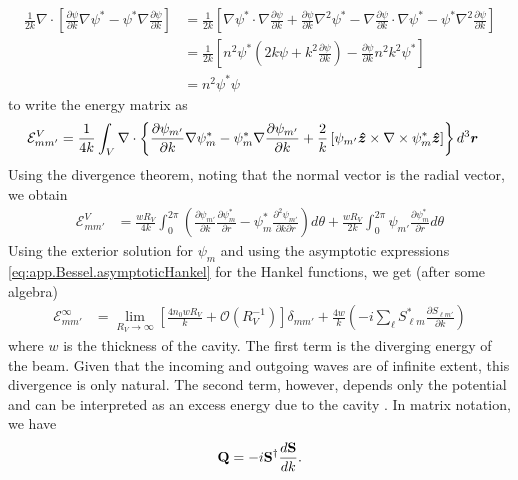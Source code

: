   \begin{align*}
   \frac{1}{2k}\nabla\cdot\left[\frac{\partial\psi}{\partial k}\nabla\psi^*-\psi^*\nabla\frac{\partial\psi}{\partial k}\right]
	&= \frac{1}{2k}\left[\nabla\psi^*\cdot\nabla\frac{\partial\psi}{\partial k}+\frac{\partial\psi}{\partial k}\nabla^2\psi^*
			  -\nabla\frac{\partial\psi}{\partial k}\cdot\nabla\psi^*-\psi^*\nabla^2\frac{\partial\psi}{\partial k}\right]	\\
	&= \frac{1}{2k}\left[n^2\psi^*\left(2k\psi+k^2\frac{\partial\psi}{\partial k}\right)-\frac{\partial\psi}{\partial k}n^2k^2\psi^*\right]\\
	&= n^2\psi^*\psi
  \end{align*}
to write the energy matrix as
  \begin{align*}
    \mathcal{E}^V_{mm'} &= \frac{1}{4k}\int_V\nabla\cdot
			    \left\{
			      \frac{\partial\psi_{m'}}{\partial k}\nabla\psi^*_{m}-\psi^*_m\nabla\frac{\partial\psi_{m'}}{\partial k}
			+   \frac{2}{k}\left[\psi_{m'}\boldsymbol{\hat{z}}\times\nabla\times\psi^*_m\boldsymbol{\hat{z}}\right]\right\}d^3\boldsymbol{r}
  \end{align*}
Using the divergence theorem, noting that the normal vector
is the radial vector, we obtain
  \begin{align*}
    \mathcal{E}^V_{mm'}	&= \frac{wR_V}{4k}
			  \int_0^{2\pi}\left(\frac{\partial\psi_{m'}}{\partial k}\frac{\partial\psi^*_m}{\partial r}
					      -\psi^*_m\frac{\partial^2\psi_{m'}}{\partial k\partial r}\right)d\theta	\nonumber
			+\frac{wR_V}{2k}
			  \int_0^{2\pi}\psi_{m'}\frac{\partial\psi^*_m}{\partial r} d\theta
  \end{align*}
Using the exterior solution for $\psi_m$ and using the 
asymptotic expressions \eqref{eq:app.Bessel.asymptoticHankel} for the Hankel functions, we get
(after some algebra)
  \begin{align}
   \mathcal{E}^{\infty}_{mm'} &= \lim_{R_V\rightarrow\infty}\left[\frac{4n_0wR_V}{k}+\mathcal{O}(R_V^{-1})\right]\delta_{mm'}
			      + \frac{4w}{k}\left(-i\sum_\ell S^*_{\ell m}\frac{\partial S_{\ell m'}}{\partial k}\right)
  \end{align}
where $w$ is the thickness of the cavity. The first term is the 
diverging energy of the beam. Given that the incoming 
and outgoing waves are of infinite extent, this divergence
is only natural. The second term, however, depends only the
potential and can be interpreted as an excess energy due to the
cavity \cite{GAP2013a}. In matrix notation, we have
  \begin{equation}
    \mathbf{Q} = -i\mathbf{S}^\dagger\frac{d\mathbf{S}}{dk}.
  \end{equation}
